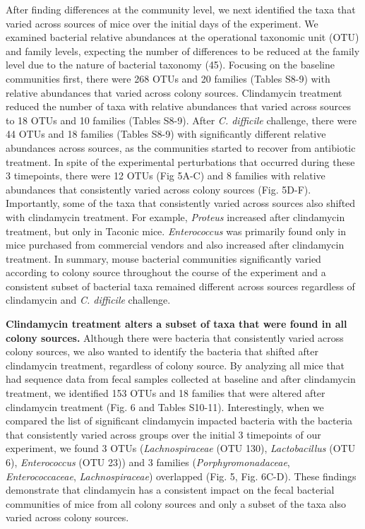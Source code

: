 \documentclass[11pt,]{article}
\begin{document}
After finding differences at the community level, we next identified the
taxa that varied across sources of mice over the initial days of the
experiment. We examined bacterial relative abundances at the operational
taxonomic unit (OTU) and family levels, expecting the number of
differences to be reduced at the family level due to the nature of
bacterial taxonomy (45). Focusing on the baseline communities first,
there were 268 OTUs and 20 families (Tables S8-9) with relative
abundances that varied across colony sources. Clindamycin treatment
reduced the number of taxa with relative abundances that varied across
sources to 18 OTUs and 10 families (Tables S8-9). After \emph{C.
difficile} challenge, there were 44 OTUs and 18 families (Tables S8-9)
with significantly different relative abundances across sources, as the
communities started to recover from antibiotic treatment. In spite of
the experimental perturbations that occurred during these 3 timepoints,
there were 12 OTUs (Fig 5A-C) and 8 families with relative abundances
that consistently varied across colony sources (Fig. 5D-F). Importantly,
some of the taxa that consistently varied across sources also shifted
with clindamycin treatment. For example, \emph{Proteus} increased after
clindamycin treatment, but only in Taconic mice. \emph{Enterococcus} was
primarily found only in mice purchased from commercial vendors and also
increased after clindamycin treatment. In summary, mouse bacterial
communities significantly varied according to colony source throughout
the course of the experiment and a consistent subset of bacterial taxa
remained different across sources regardless of clindamycin and \emph{C.
difficile} challenge.

\textbf{Clindamycin treatment alters a subset of taxa that were found in
all colony sources.} Although there were bacteria that consistently
varied across colony sources, we also wanted to identify the bacteria
that shifted after clindamycin treatment, regardless of colony source.
By analyzing all mice that had sequence data from fecal samples
collected at baseline and after clindamycin treatment, we identified 153
OTUs and 18 families that were altered after clindamycin treatment (Fig.
6 and Tables S10-11). Interestingly, when we compared the list of
significant clindamycin impacted bacteria with the bacteria that
consistently varied across groups over the initial 3 timepoints of our
experiment, we found 3 OTUs (\emph{Lachnospiraceae} (OTU 130),
\emph{Lactobacillus} (OTU 6), \emph{Enterococcus} (OTU 23)) and 3
families (\emph{Porphyromonadaceae}, \emph{Enterococcaceae},
\emph{Lachnospiraceae}) overlapped (Fig. 5, Fig. 6C-D). These findings
demonstrate that clindamycin has a consistent impact on the fecal
bacterial communities of mice from all colony sources and only a subset
of the taxa also varied across colony sources.
\end{document}
